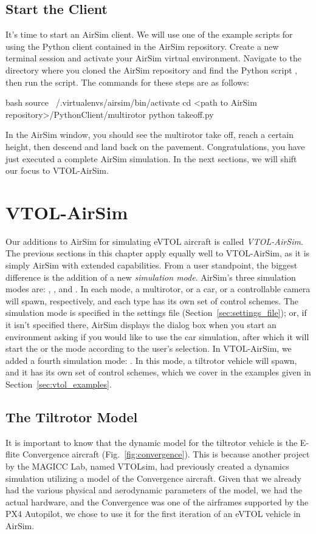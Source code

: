 \subsection{Start the Client}
It's time to start an AirSim client. We will use one of the example scripts for using the Python client contained in the AirSim repository. Create a new terminal session and activate your AirSim virtual environment. Navigate to the directory where you cloned the AirSim repository and find the Python script , then run the script. The commands for these steps are as follows:
\begin{minttcb}{bash}
    source ~/.virtualenvs/airsim/bin/activate
    cd <path to AirSim repository>/PythonClient/multirotor
    python takeoff.py
\end{minttcb}
In the AirSim window, you should see the multirotor take off, reach a certain height, then descend and land back on the pavement. Congratulations, you have just executed a complete AirSim simulation. In the next sections, we will shift our focus to VTOL-AirSim.

\section{VTOL-AirSim}\label{sec:vtolairsim}
Our additions to AirSim for simulating eVTOL aircraft is called \textit{VTOL-AirSim}. The previous sections in this chapter apply equally well to VTOL-AirSim, as it is simply AirSim with extended capabilities. From a user standpoint, the biggest difference is the addition of a new \textit{simulation mode}. AirSim's three simulation modes are: , , and . In each mode, a multirotor, or a car, or a controllable camera will spawn, respectively, and each type has its own set of control schemes. The simulation mode is specified in the settings file (Section~\ref{sec:settings_file}); or, if it isn't specified there, AirSim displays the dialog box when you start an environment asking if you would like to use the car simulation, after which it will start the  or the  mode according to the user's selection. In VTOL-AirSim, we added a fourth simulation mode: . In this mode, a tiltrotor vehicle will spawn, and it has its own set of control schemes, which we cover in the examples given in Section~\ref{sec:vtol_examples}.

\subsection{The Tiltrotor Model}\label{sec:tiltrotor_model}
It is important to know that the dynamic model for the tiltrotor vehicle is the E-flite Convergence aircraft (Fig.~\ref{fig:convergence}). This is because another project by the MAGICC Lab, named VTOLsim, had previously created a dynamics simulation utilizing a model of the Convergence aircraft. Given that we already had the various physical and aerodynamic parameters of the model, we had the actual hardware, and the Convergence was one of the airframes supported by the PX4 Autopilot, we chose to use it for the first iteration of an eVTOL vehicle in AirSim.

